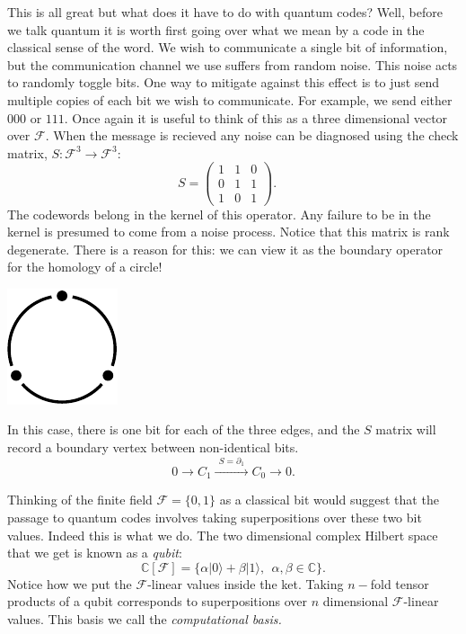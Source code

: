 \documentclass[11pt,twoside,openright]{report}
\def\Complex{\mathbb{C}}
\newcommand{\ket}[1]{|{#1}\rangle}
\newcommand{\Field}{\mathcal{F}}
\begin{document}
This is all great but what does it have to do with quantum codes?
Well, before we talk quantum it is worth first going over what we
mean by a code in the classical sense of the word.
We wish to communicate a single bit of information, 
but the communication channel we use suffers from random noise.
This noise acts to randomly toggle bits.
One way to mitigate against this effect is to just
send multiple copies of each bit we wish to communicate.
For example, we send either $000$ or $111$.
Once again it is useful to think of this as a three
dimensional vector over $\Field.$
When the message is recieved any noise can be diagnosed
using the check matrix, $S:\Field^3\to\Field^3:$
$$
S = \left( \begin{array}{lll}
1&1&0\\
0&1&1\\
1&0&1
\end{array} \right).\quad
$$
The codewords belong in the kernel of this operator.
Any failure to be in the kernel is presumed to come
from a noise process.
Notice that this matrix is rank degenerate.
There is a reason for this: we can view it as
the boundary operator for the homology of a circle!
\begin{center}
\includegraphics{pic-circle-hom.pdf}
\end{center}
In this case, there is one bit for each of the three
edges, and the $S$ matrix will record a boundary vertex
between non-identical bits.
$$
  0 \xrightarrow{\ \ \ \ } 
    C_1 \xrightarrow{\ \ S=\partial_1\ \ } 
    C_0 \xrightarrow{\ \ \ \ } 0.
$$

Thinking of the finite field $\Field=\{0,1\}$ as a classical
bit would suggest that the passage to quantum codes involves
taking superpositions over these two bit values.
Indeed this is what we do.
The two dimensional complex Hilbert space that we get
is known as a \emph{qubit}:
$$
    \Complex[\Field] = \{ \alpha \ket{0} + \beta \ket{1}, \ \ \alpha,\beta\in \Complex \}.
$$
Notice how we put the $\Field$-linear values inside the ket.
Taking $n-$fold tensor products
of a qubit corresponds to superpositions over
$n$ dimensional $\Field$-linear values.
This basis we call the \emph{computational basis.}
\end{document}
